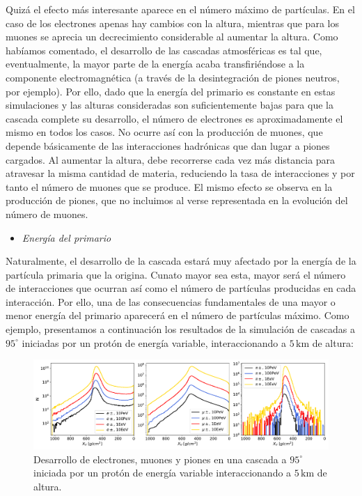 \documentclass[12 pt, a4paper]{article} %
\numberwithin{equation}{section}
\numberwithin{figure}{section}
\numberwithin{table}{section}
\begin{document}
Quizá el efecto más interesante aparece en el número máximo de partículas. En el caso de los electrones apenas hay cambios con la altura, mientras que para los muones se aprecia un decrecimiento considerable al aumentar la altura. Como habíamos comentado, el desarrollo de las cascadas atmosféricas es tal que, eventualmente, la mayor parte de la energía acaba transfiriéndose a la componente electromagnética (a través de la desintegración de piones neutros, por ejemplo). Por ello, dado que la energía del primario es constante en estas simulaciones y las alturas consideradas son suficientemente bajas para que la cascada complete su desarrollo, el número de electrones es aproximadamente el mismo en todos los casos. No ocurre así con la producción de muones, que depende básicamente de las interacciones hadrónicas que dan lugar a piones cargados. Al aumentar la altura, debe recorrerse cada vez más distancia para atravesar la misma cantidad de materia, reduciendo la tasa de interacciones y por tanto el número de muones que se produce. El mismo efecto se observa en la producción de piones, que no incluimos al verse representada en la evolución del número de muones.
\begin{itemize}
	\item \textit{Energía del primario}
\end{itemize}
Naturalmente, el desarrollo de la cascada estará muy afectado por la energía de la partícula primaria que la origina. Cunato mayor sea esta, mayor será el número de interacciones que ocurran así como el número de partículas producidas en cada interacción. Por ello, una de las consecuencias fundamentales de una mayor o menor energía del primario aparecerá en el número de partículas máximo. Como ejemplo, presentamos a continuación los resultados de la simulación de cascadas a $95^\circ$ iniciadas por un protón de energía variable, interaccionando a $5\,\mathrm{km}$ de altura: 
\begin{figure}[H]
	\centering
	\includegraphics[width=1\linewidth]{figures/cascadas/upgoing_p_varE_95deg_5km}
	\caption{Desarrollo de electrones, muones y piones en una cascada a $95^\circ$ iniciada por un protón de energía variable interaccionando a $5\,\mathrm{km}$ de altura.}
	\label{Carac_UG_varE}
\end{figure}
\end{document}
